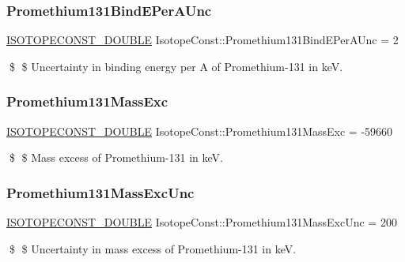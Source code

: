 \subsubsection{\texorpdfstring{Promethium131\+Bind\+E\+Per\+A\+Unc}{Promethium131BindEPerAUnc}}
{\footnotesize\ttfamily \mbox{\hyperlink{group___isotope_const-_macros_ga8f45a7272ce02c0b4c65c44636ed719a}{I\+S\+O\+T\+O\+P\+E\+C\+O\+N\+S\+T\+\_\+\+D\+O\+U\+B\+LE}} Isotope\+Const\+::\+Promethium131\+Bind\+E\+Per\+A\+Unc = 2}

\$ \$ Uncertainty in binding energy per A of Promethium-\/131 in keV. \mbox{\label{group___isotope_const-_promethium-_pm131_gaf1cce7782012be5a6ee1b91eb11e5c26}} 
\subsubsection{\texorpdfstring{Promethium131\+Mass\+Exc}{Promethium131MassExc}}
{\footnotesize\ttfamily \mbox{\hyperlink{group___isotope_const-_macros_ga8f45a7272ce02c0b4c65c44636ed719a}{I\+S\+O\+T\+O\+P\+E\+C\+O\+N\+S\+T\+\_\+\+D\+O\+U\+B\+LE}} Isotope\+Const\+::\+Promethium131\+Mass\+Exc = -\/59660}

\$ \$ Mass excess of Promethium-\/131 in keV. \mbox{\label{group___isotope_const-_promethium-_pm131_ga6b3493e8a29763941452927a73f36a99}} 
\subsubsection{\texorpdfstring{Promethium131\+Mass\+Exc\+Unc}{Promethium131MassExcUnc}}
{\footnotesize\ttfamily \mbox{\hyperlink{group___isotope_const-_macros_ga8f45a7272ce02c0b4c65c44636ed719a}{I\+S\+O\+T\+O\+P\+E\+C\+O\+N\+S\+T\+\_\+\+D\+O\+U\+B\+LE}} Isotope\+Const\+::\+Promethium131\+Mass\+Exc\+Unc = 200}

\$ \$ Uncertainty in mass excess of Promethium-\/131 in keV. \mbox{\label{group___isotope_const-_promethium-_pm131_ga0242a8335164b2d355c293905c3943db}} 
